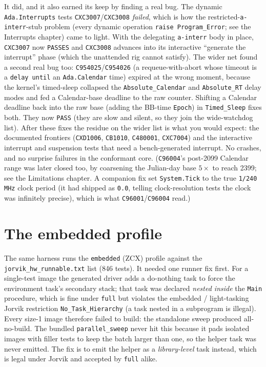 It did, and it also earned its keep by finding a real bug. The dynamic
\texttt{Ada.Interrupts} tests \texttt{CXC3007}/\texttt{CXC3008} \emph{failed},
which is how the restricted-\texttt{a-interr}-stub problem (every dynamic operation
\texttt{raise Program\_Error}; see the Interrupts chapter) came to light. With the
delegating \texttt{a-interr} body in place, \texttt{CXC3007} now \texttt{PASSES} and
\texttt{CXC3008} advances into its interactive ``generate the interrupt'' phase
(which the unattended rig cannot satisfy). The wider net found a second real bug
too: \texttt{C954025}/\texttt{C954026} (a requeue-with-abort whose timeout is a
\texttt{delay until} an \texttt{Ada.Calendar} time) expired at the wrong moment,
because the kernel's timed-sleep collapsed the \texttt{Absolute\_Calendar} and
\texttt{Absolute\_RT} delay modes and fed a Calendar-base deadline to the raw
counter. Shifting a Calendar deadline back into the raw base (adding the BB-time
\texttt{Epoch}) in \texttt{Timed\_Sleep} fixes both. They now \texttt{PASS}
(they are slow and silent, so they join the wide-watchdog list). After these
fixes the residue on the wider list is what you would expect: the documented
frontiers (\texttt{CXD1006}, \texttt{CB1010}, \texttt{C480001}, \texttt{CXC7004})
and the interactive interrupt and suspension tests that need a bench-generated
interrupt. No crashes, and no surprise failures in the conformant core.
(\texttt{C96004}'s post-2099 Calendar range was later closed too, by coarsening the
Julian-day base $5\times$ to reach 2399; see the Limitations chapter. A companion
fix set \texttt{System.Tick} to the true \texttt{1/240\,MHz} clock period (it had
shipped as \texttt{0.0}, telling clock-resolution tests the clock was infinitely
precise), which is what \texttt{C96001}/\texttt{C96004} read.)

\section{The embedded profile}

The same harness runs the \texttt{embedded} (ZCX) profile against the
\texttt{jorvik\_hw\_runnable.txt} list (846 tests). It needed one runner fix first. For a
single-test image the generated driver adds a do-nothing task to force the environment
task's secondary stack; that task was declared \emph{nested inside} the \texttt{Main}
procedure, which is fine under \texttt{full} but violates the embedded / light-tasking
Jorvik restriction \texttt{No\_Task\_Hierarchy} (a task nested in a subprogram is illegal).
Every size-1 image therefore failed to build: the standalone sweep produced
all-no-build. The bundled \texttt{parallel\_sweep} never hit this because it pads
isolated images with filler tests to keep the batch larger than one, so the helper task
was never emitted. The fix is to emit the helper as a \emph{library-level} task instead,
which is legal under Jorvik and accepted by \texttt{full} alike.

